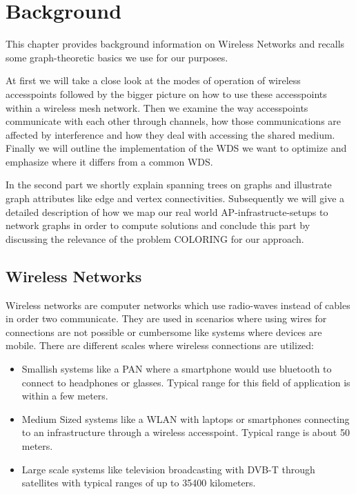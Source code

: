 \chapter{Background}
This chapter provides background information on Wireless Networks and recalls some graph-theoretic basics we use for our purposes.

At first we will take a close look at the modes of operation of wireless accesspoints followed by the bigger picture on how to use these accesspoints
within a wireless mesh network. Then we examine the way accesspoints communicate with each other through channels, how those communications are affected by interference and
how they deal with accessing the shared medium. Finally we will outline the implementation of the \ac{WDS} we want to optimize and emphasize where it differs from a common
\ac{WDS}.

In the second part we shortly explain spanning trees on graphs and illustrate graph attributes like edge and vertex connectivities.
Subsequently we will give a detailed description of how we map our real world \ac{AP}-infrastructe-setups to network graphs in order to compute solutions and conclude this part by
discussing the relevance of the problem COLORING for our approach.

\section{Wireless Networks}
  Wireless networks are computer networks which use radio-waves instead of cables in order two communicate.
  They are used in scenarios where using wires for connections are not possible or cumbersome like systems where devices are mobile.
  There are different scales where wireless connections are utilized:
  
    \begin{itemize}
      \item Smallish systems like a \ac{PAN} where a smartphone would use bluetooth to connect to headphones or glasses. Typical range for this field of
	application is within a few meters.
      \item Medium Sized systems like a \ac{WLAN} with laptops or smartphones connecting to an infrastructure through a wireless accesspoint.
	Typical range is about 50 meters.
      \item Large scale systems like television broadcasting with \ac{DVB-T} through satellites with typical ranges of up to 35400 kilometers.
    \end{itemize}
    
